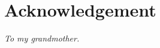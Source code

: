 \pagestyle{plain}

\vspace*{2cm}
\chapter*{Acknowledgement}









\LIMPA

\vfill


\begin{flushright}\textit{To my grandmother.}\end{flushright}

\LIMPA
